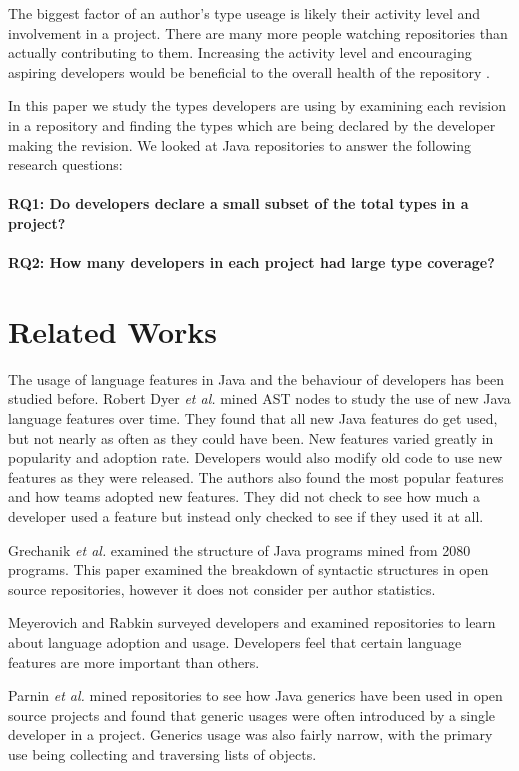 \documentclass{sig-alternate-05-2015}
\begin{document}
The biggest factor of an author's type useage is likely their activity level and involvement in a project. There are many more people watching repositories than actually contributing to them. Increasing the activity level and encouraging aspiring developers would be beneficial to the overall health of the repository \cite{Patrick:Wagstrom:2012}.

In this paper we study the types developers are using by examining each revision in a repository and finding the types which are being declared by the developer making the revision. We looked at Java repositories to answer the following research questions: \\ \\
\textbf{RQ1: Do developers declare a small subset of the total types in a project?} \\ \\
\textbf{RQ2: How many developers in each project had large type coverage?}


\section{Related Works}
The usage of language features in Java and the behaviour of developers has been studied before. 
Robert Dyer \textit{et al.} \cite{Dyer:2014:MBA:2568225.2568295} mined AST nodes to study the use of new Java language features over time. They found that all new Java features do get used, but not nearly as often as they could have been. New features varied greatly in popularity and adoption rate. Developers would also modify old code to use new features as they were released. The authors also found the most popular features and how teams adopted new features. They did not check to see how much a developer used a feature but instead only checked to see if they used it at all.

Grechanik \textit{et al.} \cite{Grechanik:2010:EIL:1852786.1852801} examined the structure of Java programs mined from 2080 programs. This paper examined the breakdown of syntactic structures in open source repositories, however it does not consider per author statistics. 

Meyerovich and Rabkin \cite{Meyerovich:2013:EAP:2509136.2509515} surveyed developers and examined repositories to learn about language adoption and usage. Developers feel that certain language features are more important than others.

Parnin \textit{et al.} \cite{Parnin:2011:JGA:1985441.1985446} mined repositories to see how Java generics have been used in open source projects and found that generic usages were often introduced by a single developer in a project. Generics usage was also fairly narrow, with the primary use being collecting and traversing lists of objects.
\end{document}
